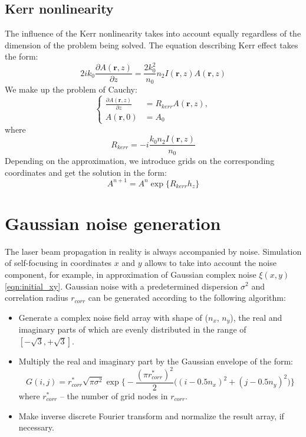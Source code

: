 \documentclass[a4paper, 12pt]{article}
\begin{document}
\subsection{Kerr nonlinearity}

The influence of the Kerr nonlinearity takes into account equally regardless of the dimension of the problem being solved. The equation describing Kerr effect takes the form:
\begin{equation}
2 i k_0  \frac{\partial A(\mathbf{r},z) }{\partial z} = \frac{2 k_0^2}{n_0} n_2 I(\mathbf{r},z) A(\mathbf{r},z)
\end{equation}
We make up the problem of Cauchy:
\begin{equation}
\label{eqn:diffraction_xy_cauchy}
\left\{
\begin{aligned}
 \frac{\partial A(\mathbf{r},z) }{\partial z} &= R_{kerr} A(\mathbf{r},z),\\
A(\mathbf{r}, 0) &= A_0
\end{aligned}
\right.
\end{equation}
where
\begin{equation}
R_{kerr} = -i\frac{k_0 n_2 I(\mathbf{r},z)}{n_0}
\end{equation}
Depending on the approximation, we introduce grids on the corresponding coordinates and get the solution in the form:
\begin{equation}
A^{n+1} = A^n \exp\{R_{kerr} h_z \}
\end{equation}



\section{Gaussian noise generation}

The laser beam propagation in reality is always accompanied by noise. Simulation of self-focusing in coordinates $x$ and $y$ allows to take into account the noise component, for example, in approximation of Gaussian complex noise $\xi(x,y)$ \eqref{eqn:initial_xy}. Gaussian noise with a predetermined dispersion $\sigma^2$ and correlation radius $r_{corr}$ can be generated according to the following algorithm:

\begin{itemize}
\item Generate a complex noise field array with shape of ($n_x$, $n_y$), the real and imaginary parts of which are evenly distributed in the range of $[-\sqrt{3}, +\sqrt{3}]$.
\item Multiply the real and imaginary part by the Gaussian envelope of the form:
\begin{equation}
G(i,j)= r_{corr}^* \sqrt{\pi \sigma^2} \exp \biggl\{ -\frac{(\pi r_{corr}^*)^2}{2} \biggl((i-0.5 n_x)^2 + (j-0.5 n_y)^2 \biggr) \biggr\}
\end{equation}
where $r_{corr}^*$ -- the number of grid nodes in $r_{corr}$.
\item Make inverse discrete Fourier transform and normalize the result array, if necessary.
\end{itemize}
\end{document}
